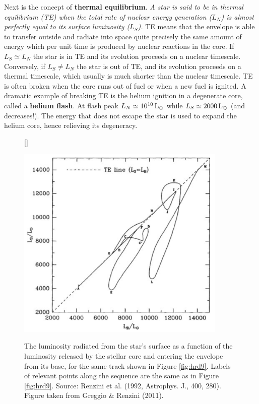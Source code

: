 \documentclass[a4paper,10pt]{article}
\begin{document}
{\noindent}Next is the concept of \textbf{thermal equilibrium}. \textit{A star is said to be in thermal equilibrium (TE) when the total rate of nuclear energy generation ($L_N$) is almost perfectly equal to its surface luminosity ($L_S$).} TE means that the envelope is able to transfer outside and radiate into space quite precisely the same amount of energy which per unit time is produced by nuclear reactions in the core. If $L_S\simeq L_N$ the star is in TE and its evolution proceeds on a nuclear timescale. Conversely, if $L_S\neq L_N$ the star is out of TE, and its evolution proceeds on a thermal timescale, which usually is much shorter than the nuclear timescale. TE is often broken when the core runs out of fuel or when a new fuel is ignited. A dramatic example of breaking TE is the helium ignition in a degenerate core, called a \textbf{helium flash}. At flash peak $L_N\simeq 10^{10}\,{\rm L_\odot}$ while $L_S\simeq2000\,{\rm L_\odot}$ (and decreases!). The energy that does not escape the star is used to expand the helium core, hence relieving its degeneracy.

\begin{figure}[h]
    [\FBwidth]
    {\caption{\footnotesize{The luminosity radiated from the star's surface as a function of the luminosity released by the stellar core and entering the envelope from its base, for the same track shown in Figure \ref{fig:hrd9}. Labels of relevant points along the sequence are the same as in Figure \ref{fig:hrd9}. Source: Renzini et al. (1992, Astrophys. J., 400, 280). Figure taken from Greggio \& Renzini (2011).}}
    \label{fig:lslb9}}
    {\includegraphics[width=10cm]{figures/LSLB_9M.png}}
\end{figure}
\end{document}
